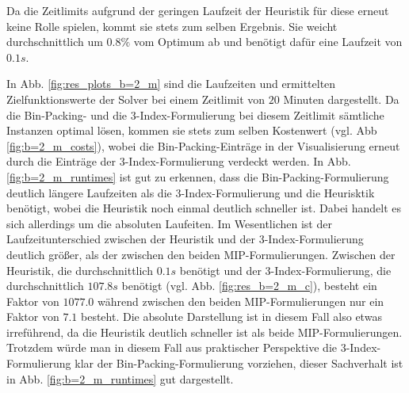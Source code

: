 Da die Zeitlimits aufgrund der geringen Laufzeit der Heuristik für diese erneut keine Rolle spielen,
kommt sie stets zum selben Ergebnis. Sie weicht durchschnittlich um $0.8 \%$ vom
Optimum ab und benötigt dafür eine Laufzeit von $0.1s$.

\pagebreak

In Abb. \ref{fig:res_plots_b=2_m} sind die Laufzeiten und ermittelten Zielfunktionswerte der Solver bei einem Zeitlimit von $20$
Minuten dargestellt. Da die Bin-Packing- und die 3-Index-Formulierung bei diesem Zeitlimit sämtliche Instanzen optimal lösen,
kommen sie stets zum selben Kostenwert (vgl. Abb \ref{fig:b=2_m_costs}),
wobei die Bin-Packing-Einträge in der Visualisierung erneut durch die Einträge der 3-Index-Formulierung verdeckt werden.
In Abb. \ref{fig:b=2_m_runtimes} ist gut zu erkennen, dass die Bin-Packing-Formulierung deutlich längere Laufzeiten als die 3-Index-Formulierung
und die Heurisktik benötigt, wobei die Heuristik noch einmal deutlich schneller ist. Dabei handelt es sich allerdings um die absoluten Laufeiten.
Im Wesentlichen ist der Laufzeitunterschied zwischen der Heuristik und der 3-Index-Formulierung deutlich größer, als der zwischen den beiden
MIP-Formulierungen. Zwischen der Heuristik, die durchschnittlich $0.1s$ benötigt und der 3-Index-Formulierung, die durchschnittlich $107.8s$ benötigt (vgl. Abb. \ref{fig:res_b=2_m_c}), besteht ein Faktor von $1077.0$ während zwischen den beiden MIP-Formulierungen nur ein Faktor von
$7.1$ besteht. Die absolute Darstellung ist in diesem Fall also etwas irreführend, da die Heuristik deutlich schneller ist als beide MIP-Formulierungen. Trotzdem würde man in diesem Fall aus praktischer Perspektive die 3-Index-Formulierung klar der Bin-Packing-Formulierung vorziehen, dieser Sachverhalt ist in Abb. \ref{fig:b=2_m_runtimes} gut dargestellt.


